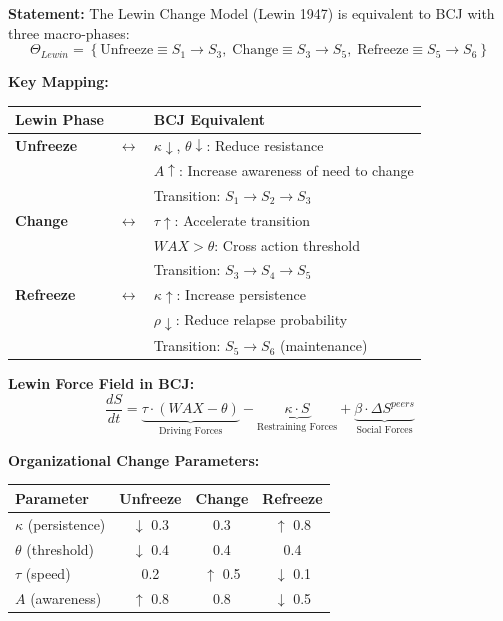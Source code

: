 \begin{tcolorbox}[colback=green!5!white, colframe=green!75!black,
    title=Theorem BCJ-T30: Lewin Change Model as Special Case]
\textbf{Statement:} The Lewin Change Model (Lewin 1947) is equivalent to BCJ with three macro-phases:
\begin{equation}
\Theta_{Lewin} = \left\{\text{Unfreeze} \equiv S_1 \to S_3, \; \text{Change} \equiv S_3 \to S_5, \; \text{Refreeze} \equiv S_5 \to S_6\right\}
\end{equation}

\textbf{Key Mapping:}
\begin{center}
\begin{tabular}{lcl}
\toprule
\textbf{Lewin Phase} & & \textbf{BCJ Equivalent} \\
\midrule
\textbf{Unfreeze} & $\leftrightarrow$ & $\kappa \downarrow$, $\theta \downarrow$: Reduce resistance \\
 & & $A \uparrow$: Increase awareness of need to change \\
 & & Transition: $S_1 \to S_2 \to S_3$ \\
\textbf{Change} & $\leftrightarrow$ & $\tau \uparrow$: Accelerate transition \\
 & & $WAX > \theta$: Cross action threshold \\
 & & Transition: $S_3 \to S_4 \to S_5$ \\
\textbf{Refreeze} & $\leftrightarrow$ & $\kappa \uparrow$: Increase persistence \\
 & & $\rho \downarrow$: Reduce relapse probability \\
 & & Transition: $S_5 \to S_6$ (maintenance) \\
\bottomrule
\end{tabular}
\end{center}

\textbf{Lewin Force Field in BCJ:}
\begin{equation}
\frac{dS}{dt} = \underbrace{\tau \cdot (WAX - \theta)}_{\text{Driving Forces}} - \underbrace{\kappa \cdot S}_{\text{Restraining Forces}} + \underbrace{\beta \cdot \Delta S^{peers}}_{\text{Social Forces}}
\end{equation}

\textbf{Organizational Change Parameters:}
\begin{center}
\begin{tabular}{lccc}
\toprule
\textbf{Parameter} & \textbf{Unfreeze} & \textbf{Change} & \textbf{Refreeze} \\
\midrule
$\kappa$ (persistence) & $\downarrow$ 0.3 & 0.3 & $\uparrow$ 0.8 \\
$\theta$ (threshold) & $\downarrow$ 0.4 & 0.4 & 0.4 \\
$\tau$ (speed) & 0.2 & $\uparrow$ 0.5 & $\downarrow$ 0.1 \\
$A$ (awareness) & $\uparrow$ 0.8 & 0.8 & $\downarrow$ 0.5 \\
\bottomrule
\end{tabular}
\end{center}


\end{tcolorbox}

